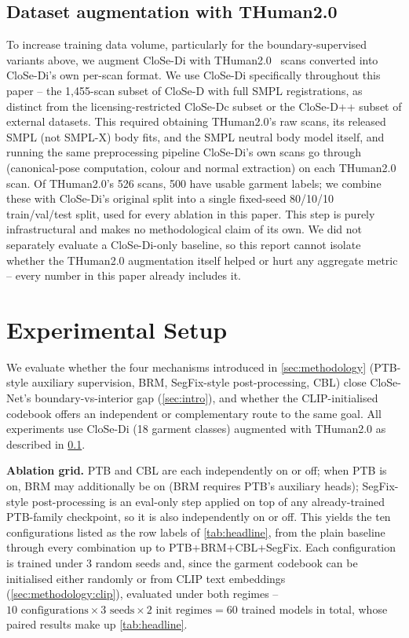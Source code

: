 \documentclass{article}
\theoremstyle{plain}
\theoremstyle{definition}
\theoremstyle{remark}
\begin{document}
\subsection{Dataset augmentation with THuman2.0}
\label{sec:methodology:thuman}

To increase training data volume, particularly for the boundary-supervised
variants above, we augment CloSe-Di with THuman2.0~\cite{tao2021function4d}
scans converted into CloSe-Di's own per-scan format. We use CloSe-Di
specifically throughout this paper -- the 1{,}455-scan subset of CloSe-D with
full SMPL registrations, as distinct from the licensing-restricted CloSe-Dc
subset or the CloSe-D++ subset of external datasets. This required obtaining
THuman2.0's raw scans, its released SMPL (not SMPL-X) body fits, and the SMPL
neutral body model itself, and running the same preprocessing pipeline
CloSe-Di's own scans go through (canonical-pose computation, colour and normal
extraction) on each THuman2.0 scan. Of THuman2.0's 526 scans, 500 have
usable garment labels; we combine these with CloSe-Di's original split into a
single fixed-seed 80/10/10 train/val/test split, used for every ablation in
this paper. This step is purely infrastructural and makes no methodological
claim of its own. We did not separately evaluate a CloSe-Di-only baseline, so
this report cannot isolate whether the THuman2.0 augmentation itself helped
or hurt any aggregate metric -- every number in this paper already includes
it.

\section{Experimental Setup}
\label{sec:setup}

We evaluate whether the four mechanisms introduced in \cref{sec:methodology}
(PTB-style auxiliary supervision, BRM, SegFix-style post-processing, CBL) close
CloSe-Net's boundary-vs-interior gap (\cref{sec:intro}), and whether the
CLIP-initialised codebook offers an independent or complementary route to the
same goal. All experiments use CloSe-Di (18 garment classes) augmented with
THuman2.0 as described in \cref{sec:methodology:thuman}.

\textbf{Ablation grid.} PTB and CBL are each independently on or off; when PTB
is on, BRM may additionally be on (BRM requires PTB's auxiliary heads);
SegFix-style post-processing is an eval-only step applied on top of any
already-trained PTB-family checkpoint, so it is also independently on or off.
This yields the ten configurations listed as the row labels of
\cref{tab:headline}, from the plain baseline through every combination up to
PTB+BRM+CBL+SegFix. Each configuration is trained under 3 random seeds and, since
the garment codebook can be initialised either randomly or from CLIP text
embeddings (\cref{sec:methodology:clip}), evaluated under both regimes --
$10 \text{ configurations} \times 3 \text{ seeds} \times 2 \text{ init regimes} = 60$
trained models in total, whose paired results make up \cref{tab:headline}.
\end{document}
